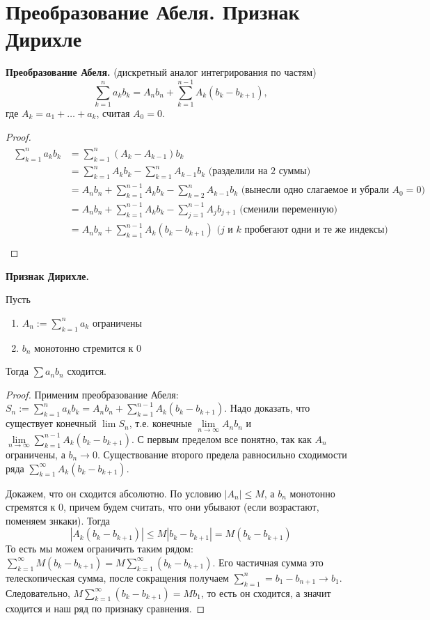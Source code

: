 \section{Преобразование Абеля. Признак Дирихле}
\textbf{Преобразование Абеля.} (дискретный аналог интегрирования по частям) \[ \sum_{k = 1}^n a_kb_k = A_nb_n + \sum_{k = 1}^{n - 1} A_k(b_k - b_{k+1}), \] где $A_k = a_1 + \dots + a_k$, считая $A_0 = 0$.
\begin{proof}
    \begin{gather*}
        \begin{split}
            \sum_{k = 1}^n a_kb_k &= \sum_{k = 1}^n (A_k - A_{k-1})b_k \\
            &= \sum_{k = 1}^n A_kb_k - \sum_{k = 1}^n A_{k-1}b_k \text{ (разделили на 2 суммы)} \\
            &= A_nb_n + \sum_{k = 1}^{n-1} A_kb_k - \sum_{k = 2}^n A_{k-1}b_k \text{ (вынесли одно слагаемое и убрали $A_0 = 0$)} \\
            &= A_nb_n + \sum_{k = 1}^{n-1} A_kb_k - \sum_{j = 1}^{n-1} A_jb_{j+1} \text{ (сменили переменную)} \\
            &= A_nb_n + \sum_{k = 1}^{n-1} A_k(b_k - b_{k+1}) \text{ ($j$ и $k$ пробегают одни и те же индексы)} \\
        \end{split}
    \end{gather*}
\end{proof} 

\textbf{Признак Дирихле.} 

 Пусть \begin{enumerate}
    \item $A_n := \sum\limits_{k = 1}^n a_k$ ограничены
    \item $b_n$ монотонно стремится к 0
\end{enumerate}
Тогда $\sum a_nb_n$ сходится.
\begin{proof}
    Применим преобразование Абеля: $S_n := \sum\limits_{k=1}^n a_kb_k = A_nb_n + \sum\limits_{k=1}^{n-1} A_k(b_k - b_{k+1})$.
    \quad Надо доказать, что существует конечный $\lim S_n$, т.е. конечные $\lim\limits_{n \to \infty} A_nb_n$ и $\lim\limits_{n \to \infty} \sum\limits_{k=1}^{n-1} A_k(b_k - b_{k+1})$.
    С первым пределом все понятно, так как $A_n$ ограничены, а $b_n \to 0$.
    Существование второго предела равносильно сходимости ряда $\sum\limits_{k=1}^{\infty} A_k(b_k - b_{k+1})$.

    \quad Докажем, что он сходится абсолютно. 
    По условию $|A_n| \leqslant M$, а $b_n$ монотонно стремятся к 0, причем будем считать, что они убывают (если возрастают, поменяем знкаки).
    Тогда \[ |A_k(b_k - b_{k+1})| \leqslant M|b_k - b_{k+1}| = M(b_k - b_{k+1}) \]
    \quad То есть мы можем ограничить таким рядом: $ \sum\limits_{k=1}^{\infty} M(b_k - b_{k+1}) = M\sum\limits_{k=1}^{\infty} (b_k - b_{k+1}) $. 
    Его частичная сумма это телескопическая сумма, после сокращения получаем $\sum\limits_{k=1}^{n} = b_1 - b_{n+1} \to b_1$.
    Следовательно, $M\sum\limits_{k=1}^{\infty} (b_k - b_{k+1}) = Mb_1$, то есть он сходится, а значит сходится и наш ряд по признаку сравнения.
\end{proof}
